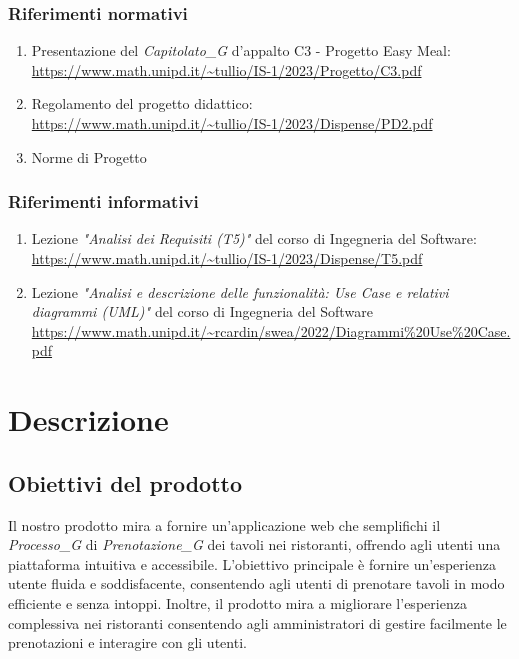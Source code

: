 \documentclass[12pt, oneside]{article}
\begin{document}
\subsubsection{Riferimenti normativi}
\begin{enumerate}
    \item Presentazione del \textit{Capitolato_G} d'appalto C3 - Progetto Easy Meal: \\ \url{https://www.math.unipd.it/~tullio/IS-1/2023/Progetto/C3.pdf}
    \item Regolamento del progetto didattico: \\ \url{https://www.math.unipd.it/~tullio/IS-1/2023/Dispense/PD2.pdf}
    \item Norme di Progetto
\end{enumerate}
\subsubsection{Riferimenti informativi}
\begin{enumerate}
    \item Lezione \emph{"Analisi dei Requisiti (T5)"} del corso di Ingegneria del Software: \\ \url{https://www.math.unipd.it/~tullio/IS-1/2023/Dispense/T5.pdf}
    \item Lezione \emph{"Analisi e descrizione delle funzionalità: Use Case e relativi diagrammi (UML)"} del corso di Ingegneria del Software \\ \url{https://www.math.unipd.it/~rcardin/swea/2022/Diagrammi%20Use%20Case.pdf}
\end{enumerate}
\newpage

\section{Descrizione}
\subsection{Obiettivi del prodotto}
Il nostro prodotto mira a fornire un'applicazione web che semplifichi il \textit{Processo_G} di \textit{Prenotazione_G} dei tavoli nei ristoranti, offrendo agli utenti una piattaforma intuitiva e accessibile. L'obiettivo principale è fornire un'esperienza utente fluida e soddisfacente, consentendo agli utenti di prenotare tavoli in modo efficiente e senza intoppi. Inoltre, il prodotto mira a migliorare l'esperienza complessiva nei ristoranti consentendo agli amministratori di gestire facilmente le prenotazioni e interagire con gli utenti.
\end{document}
